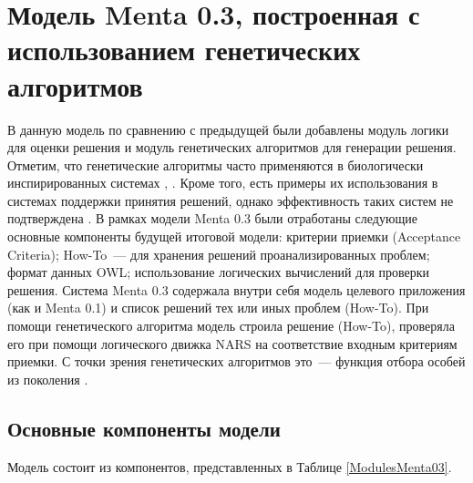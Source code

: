 \section{Модель Menta 0.3, построенная с использованием генетических алгоритмов} \label{chapt2}
В данную модель по сравнению с предыдущей были добавлены модуль логики для оценки решения и модуль генетических алгоритмов для генерации решения. Отметим, что генетические алгоритмы часто применяются в биологически инспирированных системах \cite{G1}, \cite{G3}. Кроме того, есть примеры их использования в системах поддержки принятия решений, однако эффективность таких систем не подтверждена \cite{G2}. В рамках модели Menta 0.3 были отработаны следующие основные компоненты будущей итоговой модели: критерии приемки (Acceptance Criteria); How-To~--- для хранения решений проанализированных проблем; формат данных OWL; использование логических вычислений для проверки решения. Система Menta 0.3 содержала внутри себя модель целевого приложения (как и Menta 0.1) и список решений тех или иных проблем (How-To). При помощи генетического алгоритма модель строила решение (How-To), проверяла его при помощи логического движка NARS \cite{NARS} на соответствие входным критериям приемки. С точки зрения генетических алгоритмов это~--- функция отбора особей из поколения \cite{GFITNESS}. 

\subsection{Основные компоненты модели}
Модель состоит из компонентов, представленных в Таблице \ref{ModulesMenta03}.

